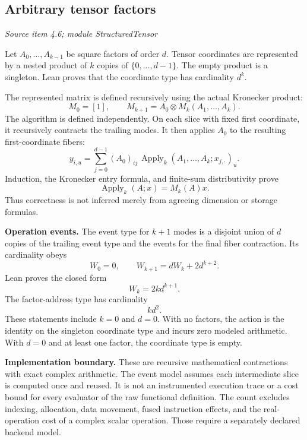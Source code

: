 \subsection{Arbitrary tensor factors}\label{supp4:subsection:003}\textit{Source item 4.6; module StructuredTensor}\par
Let $A_0,\ldots,A_{k-1}$ be square factors of order $d$. Tensor coordinates are represented by a nested product of $k$ copies of $\{0,\ldots,d-1\}$. The empty product is a singleton. Lean proves that the coordinate type has cardinality $d^k$.

The represented matrix is defined recursively using the actual Kronecker product:
\[
M_0=[1],\qquad M_{k+1}=A_0\otimes M_k(A_1,\ldots,A_k).
\]
The algorithm is defined independently. On each slice with fixed first coordinate, it recursively contracts the trailing modes. It then applies $A_0$ to the resulting first-coordinate fibers:
\[
y_{i,u}=\sum_{j=0}^{d-1}(A_0)_{ij}\,
\operatorname{Apply}_{k}(A_1,\ldots,A_k;x_{j,\cdot})_u.
\]
Induction, the Kronecker entry formula, and finite-sum distributivity prove
\[
\boxed{\operatorname{Apply}_k(A;x)=M_k(A)x.}
\]
Thus correctness is not inferred merely from agreeing dimension or storage formulas.

\textbf{Operation events.} The event type for $k+1$ modes is a disjoint union of $d$ copies of the trailing event type and the events for the final fiber contraction. Its cardinality obeys
\[
W_0=0,\qquad W_{k+1}=dW_k+2d^{k+2}.
\]
Lean proves the closed form
\[
\boxed{W_k=2kd^{k+1}.}
\]
The factor-address type has cardinality
\[
\boxed{k d^2.}
\]
These statements include $k=0$ and $d=0$. With no factors, the action is the identity on the singleton coordinate type and incurs zero modeled arithmetic. With $d=0$ and at least one factor, the coordinate type is empty.

\textbf{Implementation boundary.} These are recursive mathematical contractions with exact complex arithmetic. The event model assumes each intermediate slice is computed once and reused. It is not an instrumented execution trace or a cost bound for every evaluator of the raw functional definition. The count excludes indexing, allocation, data movement, fused instruction effects, and the real-operation cost of a complex scalar operation. Those require a separately declared backend model.



